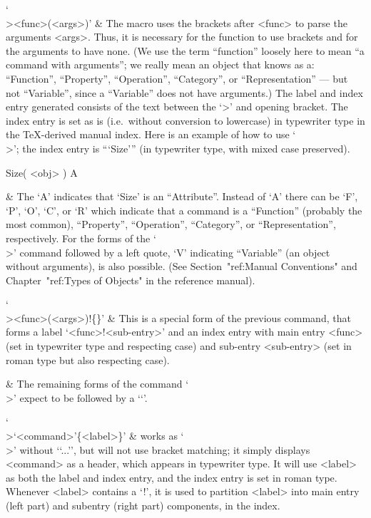 `\\><func>(<args>)' &
    The macro uses the brackets  after  <func>  to  parse  the  arguments
    <args>. Thus, it is necessary for the function to  use  brackets  and
    for the arguments to have none. (We use the term ``function'' loosely
    here to mean ``a {\GAP} command with arguments''; we really  mean  an
    object  that  {\GAP}  knows   as   a:   ``Function'',   ``Property'',
    ``Operation'',  ``Category'',  or  ``Representation''  ---  but   not
    ``Variable'', since a ``Variable''  does  not  have  arguments.)  The
    label and index entry generated consists of the text between the  `>'
    and opening bracket. The index entry is  set  as  is  (i.e.\  without
    conversion to lowercase) in typewriter  type  in  the  {\TeX}-derived
    manual index. Here is an example of how to use `\\>'; the index entry
    is ```Size'''  (in  typewriter  type,  with  mixed  case  preserved).

\begintt 
\>Size( <obj> ) A
\endtt

  & The `A' indicates that `Size' is an  ``Attribute''.  Instead  of  `A'
    there can be `F', `P', `O', `C', or `R' which indicate that a command
    is  a  ``Function''  (probably  the   most   common),   ``Property'',
    ``Operation'', ``Category'', or ``Representation'', respectively. For
    the forms of  the  `\\>'  command  followed  by  a  left  quote,  `V'
    indicating  ``Variable''  (an  object  without  arguments),  is  also
    possible.     (See     Section~"ref:Manual      Conventions"      and
    Chapter~"ref:Types of Objects" in the reference manual).

`\\><func>(<args>)!\{<sub-entry>\}' &
    This is a special form of the previous command, that  forms  a  label
    `<func>!<sub-entry>' and an index entry with main entry  <func>  (set
    in typewriter type and respecting  case)  and  sub-entry  <sub-entry>
    (set in roman type but also respecting case).

  & The remaining forms of the command `\\>' expect to be followed by a
    `\lq'.

`\\>\lq<command>\rq\{<label>\}' &
    works  as  `\\>'  without  `\lq...\rq',  but  will  not  use  bracket
    matching; it simply displays <command> as a header, which appears  in
    typewriter type. It will use <label> as  both  the  label  and  index
    entry, and the index entry is set in  roman  type.  Whenever  <label>
    contains a `!', it is used to partition <label> into main entry (left
    part) and subentry (right part) components, in the index.

